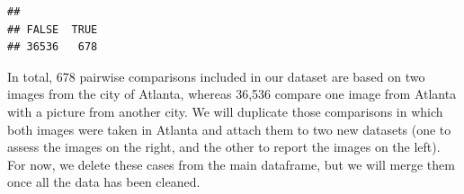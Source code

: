 \documentclass[
]{article}
\newenvironment{Shaded}{\begin{snugshade}}{\end{snugshade}}
\newcommand{\CommentTok}[1]{\textcolor[rgb]{0.56,0.35,0.01}{\textit{#1}}}
\newcommand{\KeywordTok}[1]{\textcolor[rgb]{0.13,0.29,0.53}{\textbf{#1}}}
\newcommand{\NormalTok}[1]{#1}
\newcommand{\OperatorTok}[1]{\textcolor[rgb]{0.81,0.36,0.00}{\textbf{#1}}}
\newcommand{\StringTok}[1]{\textcolor[rgb]{0.31,0.60,0.02}{#1}}
\begin{document}
\begin{Shaded}
\end{Shaded}

\begin{verbatim}
## 
## FALSE  TRUE 
## 36536   678
\end{verbatim}

In total, 678 pairwise comparisons included in our dataset are based on
two images from the city of Atlanta, whereas 36,536 compare one image
from Atlanta with a picture from another city. We will duplicate those
comparisons in which both images were taken in Atlanta and attach them
to two new datasets (one to assess the images on the right, and the
other to report the images on the left). For now, we delete these cases
from the main dataframe, but we will merge them once all the data has
been cleaned.

\begin{Shaded}
\end{Shaded}
\end{document}
